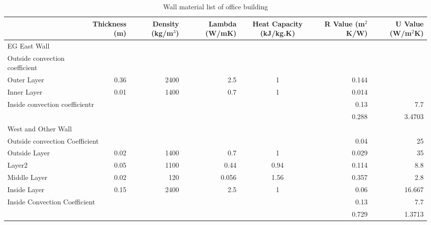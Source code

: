 \documentclass[a4paper, oneside]{discothesis}
\begin{document}
			\newpage
			\begin{table}[h!]
			  \centering
			\caption{Wall material list of office building}
			    \begin{tabular}{lrrrcrr}
			    \toprule
			         & \multicolumn{1}{p{4em}}{Thickness \newline{}(m)} & \multicolumn{1}{p{3.145em}}{Density \newline{}(kg/m$^3$)} & \multicolumn{1}{p{3.285em}}{Lambda \newline{}(W/mK)} & \multicolumn{1}{p{5.1em}}{Heat \newline{}Capacity (kJ/kg.K)} & \multicolumn{1}{p{3.5em}}{R Value \newline{}(m$^2$K/W)} & \multicolumn{1}{p{3.145em}}{U Value \newline{}(W/m$^2$K)} \\
			    \midrule
			    \multicolumn{7}{p{26.86em}}{EG East Wall} \\
			    \multicolumn{1}{l}{Outside convection coefficient} &      &      &      &      &      &  \\
			    \multicolumn{1}{p{6.785em}}{Outer Layer} & 0.36 & 2400 & 2.5  & 1    & 0.144 &  \\
			    \multicolumn{1}{p{6.785em}}{Inner Layer} & 0.01 & 1400 & 0.7  & 1    & 0.014 &  \\
			    \multicolumn{3}{p{13.93em}}{Inside convection coefficientr} &      &      & 0.13 & 7.7 \\
			         &      &      &      &      & 0.288 & 3.4703 \\
			    \midrule
			    \multicolumn{7}{p{26.86em}}{West and Other Wall} \\
			    \multicolumn{4}{p{17.215em}}{Outside convection Coefficient} &      & 0.04 & 25 \\
			    \multicolumn{1}{p{6.785em}}{Outside Layer} & 0.02 & 1400 & 0.7  & 1    & 0.029 & 35 \\
			    \multicolumn{1}{p{6.785em}}{Layer2} & 0.05 & 1100 & 0.44 & 0.94 & 0.114 & 8.8 \\
			    \multicolumn{1}{p{6.785em}}{Middle Layer} & 0.02 & 120  & 0.056 & 1.56 & 0.357 & 2.8 \\
			    \multicolumn{1}{p{6.785em}}{Inside Layer} & 0.15 & 2400 & 2.5  & 1    & 0.06 & 16.667 \\
			    \multicolumn{4}{p{17.215em}}{Inside Convection Coefficient} &      & 0.13 & 7.7 \\
			         &      &      &      &      & 0.729 & 1.3713 \\

\end{tabular}
\end{table}
\end{document}
